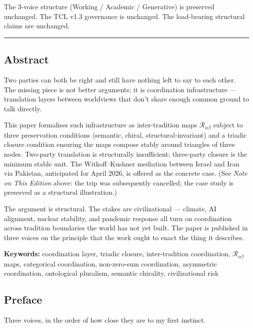 \documentclass[
]{article}
\begin{document}
The 3-voice structure (Working / Academic / Generative) is preserved
unchanged. The TCL v1.3 governance is unchanged. The load-bearing
structural claims are unchanged.

\begin{center}\rule{0.5\linewidth}{0.5pt}\end{center}

\subsection{Abstract}\label{abstract}

Two parties can both be right and still have nothing left to say to each
other. The missing piece is not better arguments; it is coordination
infrastructure --- translation layers between worldviews that don't
share enough common ground to talk directly.

This paper formalises such infrastructure as inter-tradition maps
\(\mathcal{R}_{\alpha\beta}\) subject to three preservation conditions
(semantic, chiral, structural-invariant) and a triadic closure condition
ensuring the maps compose stably around triangles of three nodes.
Two-party translation is structurally insufficient; three-party closure
is the minimum stable unit. The Witkoff--Kushner mediation between
Israel and Iran via Pakistan, anticipated for April 2026, is offered as
the concrete case. (See \emph{Note on This Edition} above: the trip was
subsequently cancelled; the case study is preserved as a structural
illustration.)

The argument is structural. The stakes are civilizational --- climate,
AI alignment, nuclear stability, and pandemic response all turn on
coordination across tradition boundaries the world has not yet built.
The paper is published in three voices on the principle that the work
ought to enact the thing it describes.

\textbf{Keywords:} coordination layer, triadic closure, inter-tradition
coordination, \(\mathcal{R}_{\alpha\beta}\) maps, categorical
coordination, non-zero-sum coordination, asymmetric coordination,
ontological pluralism, semantic chirality, civilizational risk

\subsection{Preface}\label{preface}

Three voices, in the order of how close they are to my first instinct.
\end{document}
